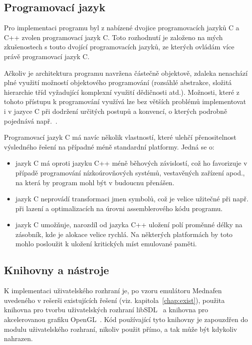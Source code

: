 %
%

\subsection{Programovací jazyk}\label{chap:impl_env_lang}

Pro implementaci programu byl z nabízené dvojice programovacích jazyků C a C++
zvolen programovací jazyk C. Toto rozhodnutí je založeno na mých zkušenostech s
touto dvojící programovacích jazyků, ze kterých ovládám více právě programovací
jazyk C.

Ačkoliv je architektura programu navržena částečně objektově, zdaleka nenachází
plné využití možností objektového programování (rozsáhlé abstrakce, složitá
hierarchie tříd vyžadující komplexní využití dědičnosti atd.). Možnosti, které
z tohoto přístupu k programování využívá lze bez větších problémů implementovat
i v jazyce C při dodržení určitých postupů a konvencí, o kterých podrobně
pojednává např.~\cite{Schreiner94}.

Programovací jazyk C má navíc několik vlastností, které ulehčí přenositelnost
výsledného řešení na případné méně standardní platformy. Jedná se o:

\begin{itemize}
\item jazyk C má oproti jazyku C++ méně běhových závislostí, což ho favorizuje
	v případě programování nízkoúrovňových systémů, vestavěných zařízení apod.,
	na která by program mohl být v budoucnu přenášen.

\item jazyk C neprovádí transformaci jmen symbolů, což je velice užitečné při
	např. při lazení a optimalizacích na úrovni assemblerového kódu programu.

\item jazyk C umožňuje, narozdíl od jazyka C++ uložení polí proměnné délky na
	zásobník, kde je alokace velice rychlá. Na některých platformách by toto
	mohlo posloužit k uložení kritických míst emulované paměti.
\end{itemize}

%
%

\subsection{Knihovny a nástroje}\label{chap:impl_env_tools}

K implementaci uživatelského rozhraní je, po vzoru emulátoru Mednafen uvedeného
v rešerši existujících řešení (viz. kapitola~\ref{chap:exist}), použita
knihovna pro tvorbu uživatelských rozhraní libSDL~\cite{wwwlibSDL} a knihovna
pro akcelerovanou grafiku OpenGL~\cite{wwwOpenGL}. Kód používající tyto
knihovny je zapouzdřen do modulu uživatelského rozhraní, nikoliv použit přímo,
a tak může být kdykoliv nahrazen.

